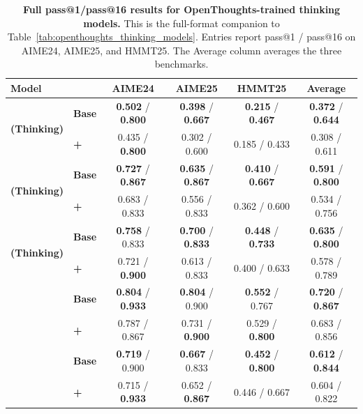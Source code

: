 \begin{table}[!htbp]
\centering
\caption{\textbf{Full pass@1/pass@16 results for OpenThoughts-trained thinking models.}
This is the full-format companion to Table~\ref{tab:openthoughts_thinking_models}. Entries report pass@1 / pass@16 on AIME24, AIME25, and HMMT25. The Average column averages the three benchmarks.}
\label{tab:openthoughts_thinking_models_full}
\footnotesize
\setlength{\tabcolsep}{3pt}
\renewcommand{\arraystretch}{1.12}

\newcommand{\metrichead}[1]{%
  \textbf{#1}%
}

\begin{tabular*}{\textwidth}{@{\extracolsep{\fill}}llcccc@{}}
\toprule
\textbf{Model}
&
& \metrichead{AIME24}
& \metrichead{AIME25}
& \metrichead{HMMT25}
& \metrichead{Average} \\
\midrule

\multirow{2}{*}{\textbf{\qwenonesevenb{} (Thinking)}}
& \textbf{Base}
& \textbf{0.502} / \textbf{0.800}
& \textbf{0.398} / \textbf{0.667}
& \textbf{0.215} / \textbf{0.467}
& \textbf{0.372} / \textbf{0.644} \\
&
\textbf{+\opsd{}}
& 0.435 / \textbf{0.800}
& 0.302 / 0.600
& 0.185 / 0.433
& 0.308 / 0.611 \\
\midrule

\multirow{2}{*}{\textbf{\qwenfourb{} (Thinking)}}
& \textbf{Base}
& \textbf{0.727} / \textbf{0.867}
& \textbf{0.635} / \textbf{0.867}
& \textbf{0.410} / \textbf{0.667}
& \textbf{0.591} / \textbf{0.800} \\
&
\textbf{+\opsd{}}
& 0.683 / 0.833
& 0.556 / 0.833
& 0.362 / 0.600
& 0.534 / 0.756 \\
\midrule

\multirow{2}{*}{\textbf{\qweneightb{} (Thinking)}}
& \textbf{Base}
& \textbf{0.758} / 0.833
& \textbf{0.700} / \textbf{0.833}
& \textbf{0.448} / \textbf{0.733}
& \textbf{0.635} / \textbf{0.800} \\
&
\textbf{+\opsd{}}
& 0.721 / \textbf{0.900}
& 0.613 / 0.833
& 0.400 / 0.633
& 0.578 / 0.789 \\
\midrule

\multirow{2}{*}{\textbf{\qwenfourbthink{}}}
& \textbf{Base}
& \textbf{0.804} / \textbf{0.933}
& \textbf{0.804} / 0.900
& \textbf{0.552} / 0.767
& \textbf{0.720} / \textbf{0.867} \\
&
\textbf{+\opsd{}}
& 0.787 / 0.867
& 0.731 / \textbf{0.900}
& 0.529 / \textbf{0.800}
& 0.683 / 0.856 \\
\midrule

\multirow{2}{*}{\textbf{\olmosevenbthink{}}}
& \textbf{Base}
& \textbf{0.719} / 0.900
& \textbf{0.667} / 0.833
& \textbf{0.452} / \textbf{0.800}
& \textbf{0.612} / \textbf{0.844} \\
&
\textbf{+\opsd{}}
& 0.715 / \textbf{0.933}
& 0.652 / \textbf{0.867}
& 0.446 / 0.667
& 0.604 / 0.822 \\

\bottomrule
\end{tabular*}
\end{table}
